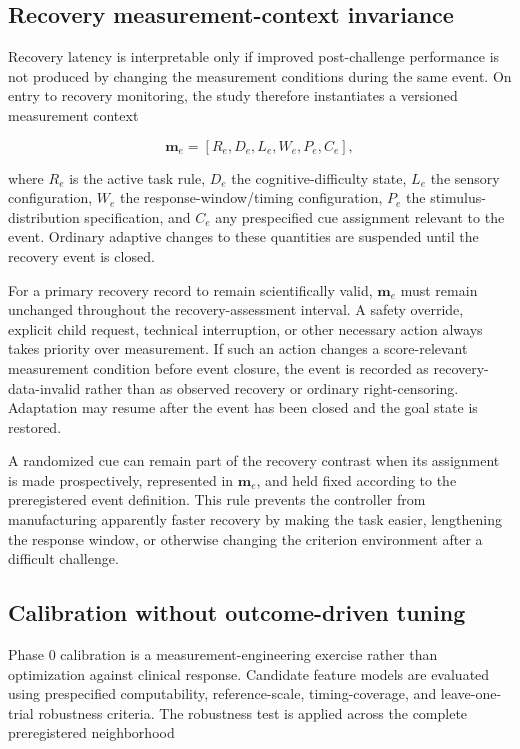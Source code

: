 \subsection{Recovery measurement-context invariance}

Recovery latency is interpretable only if improved post-challenge performance is not produced by changing the measurement conditions during the same event. On entry to recovery monitoring, the study therefore instantiates a versioned measurement context

\[
\mathbf{m}_e =
\left[
R_e,
D_e,
L_e,
W_e,
P_e,
C_e
\right],
\]

where \(R_e\) is the active task rule, \(D_e\) the cognitive-difficulty state, \(L_e\) the sensory configuration, \(W_e\) the response-window/timing configuration, \(P_e\) the stimulus-distribution specification, and \(C_e\) any prespecified cue assignment relevant to the event. Ordinary adaptive changes to these quantities are suspended until the recovery event is closed.

For a primary recovery record to remain scientifically valid, \(\mathbf{m}_e\) must remain unchanged throughout the recovery-assessment interval. A safety override, explicit child request, technical interruption, or other necessary action always takes priority over measurement. If such an action changes a score-relevant measurement condition before event closure, the event is recorded as recovery-data-invalid rather than as observed recovery or ordinary right-censoring. Adaptation may resume after the event has been closed and the goal state is restored.

A randomized cue can remain part of the recovery contrast when its assignment is made prospectively, represented in \(\mathbf{m}_e\), and held fixed according to the preregistered event definition. This rule prevents the controller from manufacturing apparently faster recovery by making the task easier, lengthening the response window, or otherwise changing the criterion environment after a difficult challenge.

\subsection{Calibration without outcome-driven tuning}

Phase 0 calibration is a measurement-engineering exercise rather than optimization against clinical response. Candidate feature models are evaluated using prespecified computability, reference-scale, timing-coverage, and leave-one-trial robustness criteria. The robustness test is applied across the complete preregistered neighborhood

